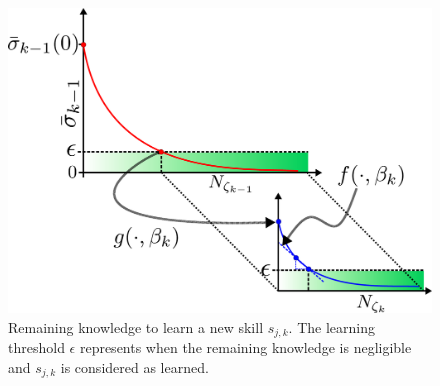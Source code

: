 
\begin{figure}[!t]
	\centering
	\includegraphics[width=0.95\columnwidth]{fig/effect_transfer_learning.pdf}
	\caption{Remaining knowledge to learn a new skill $s_{j,k}$. The learning threshold $\epsilon$ represents when the remaining knowledge is negligible and $s_{j,k}$ is considered as learned.}
	\label{fig:knowledge_idealization}
\end{figure}
